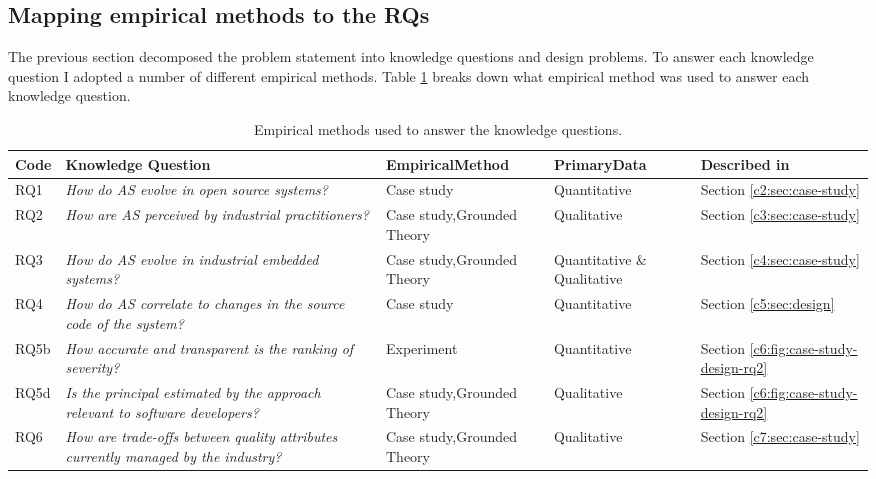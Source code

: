 \subsection{Mapping empirical methods to the RQs}
The previous section decomposed the problem statement into knowledge questions and design problems.
To answer each knowledge question I adopted a number of different empirical methods.
Table \ref{c1:tab:overview-methodology} breaks down what empirical method was used to answer each knowledge question.

\begin{table}[]
    \footnotesize
    \centering
    \caption{Empirical methods used to answer the knowledge questions.}
    \label{c1:tab:overview-methodology}
    \begin{tabular}{@{}lm{3.75cm}m{2.75cm}m{2cm}l@{}}
    \toprule
    \textbf{Code} & \textbf{Knowledge Question} & \textbf{Empirical}\newline \textbf{Method} & \textbf{Primary}\newline \textbf{Data} & \textbf{Described in} \\ \midrule
    RQ1 & \textit{How do AS evolve in open source systems?} & Case study & Quantitative & Section \ref{c2:sec:case-study} \\
    RQ2 & \textit{How are AS perceived by industrial practitioners?} & Case study,\newline Grounded Theory & Qualitative & Section \ref{c3:sec:case-study}  \\
    RQ3 & \textit{How do AS evolve in industrial embedded systems?} & Case study,\newline Grounded Theory & Quantitative \& Qualitative & Section \ref{c4:sec:case-study} \\
    RQ4 & \textit{How do AS correlate to changes in the source code of the system?} & Case study & Quantitative  & Section \ref{c5:sec:design} \\
    RQ5b & \textit{How accurate and transparent is the ranking of severity?} & Experiment & Quantitative & Section \ref{c6:fig:case-study-design-rq2}  \\ 
    RQ5d & \textit{Is the principal estimated by the approach relevant to software developers?} & Case study,\newline Grounded Theory & Qualitative & Section \ref{c6:fig:case-study-design-rq2}  \\ 
    RQ6 & \textit{How are trade-offs between quality attributes currently managed by the industry?} & Case study,\newline Grounded Theory & Qualitative & Section \ref{c7:sec:case-study} \\ \bottomrule
    \end{tabular}
\end{table}

